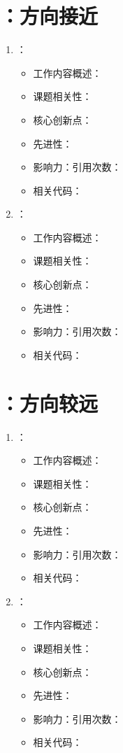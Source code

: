 \section{：方向接近}
    \begin{enumerate}
        \item \citet{}：
            \begin{itemize}
                \item 工作内容概述：
                \item 课题相关性：
                \item 核心创新点：
                \item 先进性：
                \item 影响力：引用次数：
                \item 相关代码：
            \end{itemize}
        \item \citet{}：
            \begin{itemize}
                \item 工作内容概述：
                \item 课题相关性：
                \item 核心创新点：
                \item 先进性：
                \item 影响力：引用次数：
                \item 相关代码：
            \end{itemize}
    \end{enumerate}
\section{：方向较远}
\begin{enumerate}
    \item \citet{}：
        \begin{itemize}
            \item 工作内容概述：
            \item 课题相关性：
            \item 核心创新点：
            \item 先进性：
            \item 影响力：引用次数：
            \item 相关代码：
        \end{itemize}
    \item \citet{}：
        \begin{itemize}
            \item 工作内容概述：
            \item 课题相关性：
            \item 核心创新点：
            \item 先进性：
            \item 影响力：引用次数：
            \item 相关代码：
        \end{itemize}
\end{enumerate}